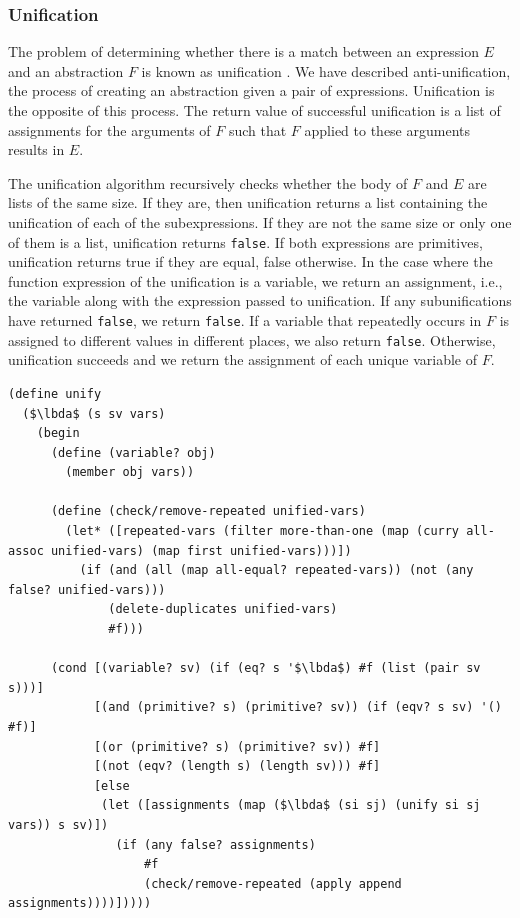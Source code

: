 \documentclass[a4paper,10pt]{article}
\newcommand{\lbda}{\color[rgb]{0,.3,.7} \lambda}
\begin{document}
\subsubsection{Unification}

The problem of determining whether there is a match between an expression $E$ and an abstraction $F$ is known as unification \cite{Robinson:1965:MLB:321250.321253}. We have described anti-unification, the process of creating an abstraction given a pair of expressions. Unification is the opposite of this process.  The return value of successful unification is a list of assignments for the arguments of $F$ such that $F$ applied to these arguments results in $E$.

The unification algorithm recursively checks whether the body of $F$ and $E$ are lists of the same size.  If they are, then unification returns a list containing the unification of each of the subexpressions.  If they are not the same size or only one of them is a list, unification returns \texttt{false}.  If both expressions are primitives, unification returns true if they are equal, false otherwise.  In the case where the function expression of the unification is a variable, we return an assignment, i.e., the variable along with the expression passed to unification. If any subunifications have returned \texttt{false}, we return \texttt{false}. If a variable that repeatedly occurs in $F$ is assigned to different values in different places, we also return \texttt{false}.
Otherwise, unification succeeds and we return the assignment of each unique variable of $F$.

\begin{lstlisting}[frame=trbl]
(define unify
  ($\lbda$ (s sv vars)
    (begin
      (define (variable? obj)
        (member obj vars))

      (define (check/remove-repeated unified-vars)
        (let* ([repeated-vars (filter more-than-one (map (curry all-assoc unified-vars) (map first unified-vars)))])
          (if (and (all (map all-equal? repeated-vars)) (not (any false? unified-vars)))
              (delete-duplicates unified-vars)
              #f)))
      
      (cond [(variable? sv) (if (eq? s '$\lbda$) #f (list (pair sv s)))]
            [(and (primitive? s) (primitive? sv)) (if (eqv? s sv) '() #f)]
            [(or (primitive? s) (primitive? sv)) #f]
            [(not (eqv? (length s) (length sv))) #f]
            [else
             (let ([assignments (map ($\lbda$ (si sj) (unify si sj vars)) s sv)])
               (if (any false? assignments)
                   #f
                   (check/remove-repeated (apply append assignments))))]))))
\end{lstlisting}
\end{document}
